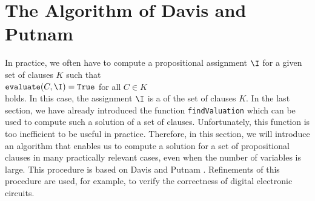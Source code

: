 
\section{The Algorithm of Davis and Putnam}
In practice, we often have to compute a propositional assignment $\I$ for a given set of clauses $K$ such that
\\[0.2cm]
\hspace*{1.3cm} $\texttt{evaluate}(C,\I) = \texttt{True}$ \quad for all $C \in K$ \\[0.2cm]
holds. In this case,  the assignment $\I$ is a  of the set of clauses $K$. In
the last section, we have already introduced the function \texttt{findValuation} which can be used to compute
such a solution of a set of clauses.  Unfortunately, this function is too inefficient to be useful in
practice.
Therefore, in this section, we will introduce an algorithm that enables us to compute a solution for a
set of propositional clauses in many practically relevant cases, even when the number of variables is
large. This procedure is based on Davis and Putnam \cite{davis:1960, davis:1962}. Refinements of this procedure
\cite{moskewicz:2001} are used, for example, to verify the correctness of digital electronic circuits. 


